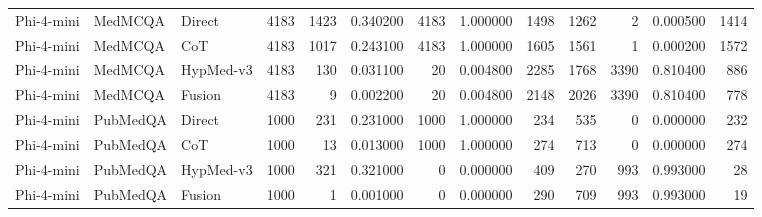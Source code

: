 \begin{tabular}{lllrrrrrrrrrr}
Phi-4-mini & MedMCQA & Direct & 4183 & 1423 & 0.340200 & 4183 & 1.000000 & 1498 & 1262 & 2 & 0.000500 & 1414 \\
Phi-4-mini & MedMCQA & CoT & 4183 & 1017 & 0.243100 & 4183 & 1.000000 & 1605 & 1561 & 1 & 0.000200 & 1572 \\
Phi-4-mini & MedMCQA & HypMed-v3 & 4183 & 130 & 0.031100 & 20 & 0.004800 & 2285 & 1768 & 3390 & 0.810400 & 886 \\
Phi-4-mini & MedMCQA & Fusion & 4183 & 9 & 0.002200 & 20 & 0.004800 & 2148 & 2026 & 3390 & 0.810400 & 778 \\
Phi-4-mini & PubMedQA & Direct & 1000 & 231 & 0.231000 & 1000 & 1.000000 & 234 & 535 & 0 & 0.000000 & 232 \\
Phi-4-mini & PubMedQA & CoT & 1000 & 13 & 0.013000 & 1000 & 1.000000 & 274 & 713 & 0 & 0.000000 & 274 \\
Phi-4-mini & PubMedQA & HypMed-v3 & 1000 & 321 & 0.321000 & 0 & 0.000000 & 409 & 270 & 993 & 0.993000 & 28 \\
Phi-4-mini & PubMedQA & Fusion & 1000 & 1 & 0.001000 & 0 & 0.000000 & 290 & 709 & 993 & 0.993000 & 19 \\
\bottomrule
\end{tabular}
